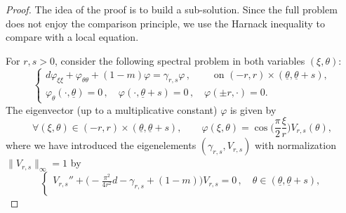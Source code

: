 \documentclass[11pt]{article}    %
\begin{document}
\begin{proof}%
The idea of the proof is to build a sub-solution.  Since the full problem does not enjoy the comparison principle, we use the Harnack inequality to compare with a local equation. 

For $r,s>0$, consider the following spectral problem in both variables $(\xi,\theta)$:
\begin{equation}\label{eq:evpb}
\begin{cases}
d \varphi_{\xi\xi}   +  \varphi_{\theta\theta}  + (1-m) \varphi   = \gamma_{r,s} \varphi \,, \qquad \text{ on } (-r,r) \times (\underline\theta, \underline\theta + s),\\
\varphi_\theta (\cdot,\underline\theta) = 0\,, \quad \varphi (\cdot,\underline\theta + s) = 0\,, \quad \varphi(\pm r,\cdot) = 0.
\end{cases}
\end{equation}
%
The eigenvector (up to a multiplicative constant) $\varphi$ is given by 
\begin{equation*}
\forall (\xi,\theta) \in (-r,r) \times (\underline\theta, \underline\theta + s), \qquad \varphi(\xi,\theta)= \cos\Big( \frac{\pi}{2}\frac{\xi}{r}\Big) V_{r,s}(\theta),
\end{equation*}
where we have introduced the eigenelements $(\gamma_{r,s},V_{r,s})$ with normalization $\|V_{r,s}\|_\infty = 1$ by
\begin{equation*}
\begin{cases}
V_{r,s}''  + \big( - \frac{\pi^2}{4r^2} d - \gamma_{r,s} + (1-m) \big) V_{r,s}   = 0 \,, \quad \theta \in (\underline\theta, \underline\theta + s),\\

\end{cases}
\end{equation*}
\end{proof}
\end{document}
